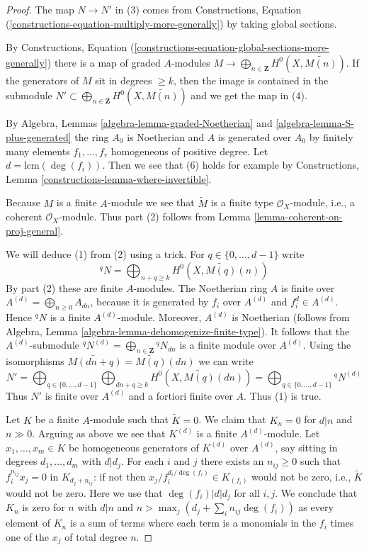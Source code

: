 \documentclass[10pt,a4paper]{amsart}
\theoremstyle{plain}
\theoremstyle{definition}
\theoremstyle{remark}
\numberwithin{equation}{subsection}
\begin{document}
\begin{proof}
The map $N \to N'$ in (3) comes from
Constructions, Equation (\ref{constructions-equation-multiply-more-generally})
by taking global sections.

\medskip\noindent
By
Constructions, Equation
(\ref{constructions-equation-global-sections-more-generally})
there is a map of graded $A$-modules
$M \to \bigoplus_{n \in \mathbf{Z}} H^0(X, \widetilde{M(n)})$.
If the generators of $M$ sit in degrees $\geq k$, then the image
is contained in the submodule
$N' \subset \bigoplus_{n \in \mathbf{Z}} H^0(X, \widetilde{M(n)})$
and we get the map in (4).

\medskip\noindent
By Algebra, Lemmas \ref{algebra-lemma-graded-Noetherian} and
\ref{algebra-lemma-S-plus-generated} the ring $A_0$ is Noetherian
and $A$ is generated over $A_0$ by finitely many elements
$f_1, \ldots, f_r$ homogeneous of positive degree.
Let $d = \text{lcm}(\deg(f_i))$. Then we see that (6) holds
for example by
Constructions, Lemma \ref{constructions-lemma-where-invertible}.

\medskip\noindent
Because $M$ is a finite $A$-module we see that
$\widetilde{M}$ is a finite type $\mathcal{O}_X$-module,
i.e., a coherent $\mathcal{O}_X$-module.
Thus part (2) follows from Lemma \ref{lemma-coherent-on-proj-general}.

\medskip\noindent
We will deduce (1) from (2) using a trick. For $q \in \{0, \ldots, d - 1\}$
write
$$
{}^qN = \bigoplus\nolimits_{n + q \geq k} H^0(X, \widetilde{M(q)}(n))
$$
By part (2) these are finite $A$-modules. The Noetherian ring $A$
is finite over $A^{(d)} = \bigoplus_{n \geq 0} A_{dn}$, because
it is generated by $f_i$ over $A^{(d)}$ and $f_i^d \in A^{(d)}$.
Hence ${}^qN$ is a finite $A^{(d)}$-module.
Moreover, $A^{(d)}$ is Noetherian (follows from
Algebra, Lemma \ref{algebra-lemma-dehomogenize-finite-type}).
It follows that the $A^{(d)}$-submodule
${}^qN^{(d)} = \bigoplus_{n \in \mathbf{Z}} {}^qN_{dn}$
is a finite module over $A^{(d)}$. Using the isomorphisms
$\widetilde{M(dn + q)} = \widetilde{M(q)}(dn)$ we can write
$$
N' =
\bigoplus\nolimits_{q \in \{0, \ldots, d - 1\}}
\bigoplus\nolimits_{dn + q \geq k}
H^0(X, \widetilde{M(q)}(dn)) =
\bigoplus\nolimits_{q \in \{0, \ldots, d - 1\}} {}^qN^{(d)}
$$
Thus $N'$ is finite over $A^{(d)}$ and a fortiori finite over $A$.
Thus (1) is true.

\medskip\noindent
Let $K$ be a finite $A$-module such that $\widetilde{K} = 0$. We claim
that $K_n = 0$ for $d|n$ and $n \gg 0$. Arguing as above we see that
$K^{(d)}$ is a finite $A^{(d)}$-module. Let
$x_1, \ldots, x_m \in K$ be homogeneous generators of $K^{(d)}$
over $A^{(d)}$, say sitting in degrees $d_1, \ldots, d_m$ with $d | d_j$.
For each $i$ and $j$ there exists an $n_{ij} \geq 0$ such that
$f_i^{n_{ij}} x_j = 0$ in $K_{d_j + n_{ij}}$: if not then
$x_j/f_i^{d_i/\deg(f_i)} \in K_{(f_i)}$ would not be zero, i.e.,
$\widetilde{K}$ would not be zero. Here we use that $\deg(f_i) | d | d_j$
for all $i, j$. We conclude that $K_n$ is zero for
$n$ with $d | n$ and $n > \max_j (d_j + \sum_i n_{ij} \deg(f_i))$
as every element of $K_n$ is a sum of terms where each term is a
monomials in the $f_i$ times one of the $x_j$ of total degree $n$.


\end{proof}
\end{document}
